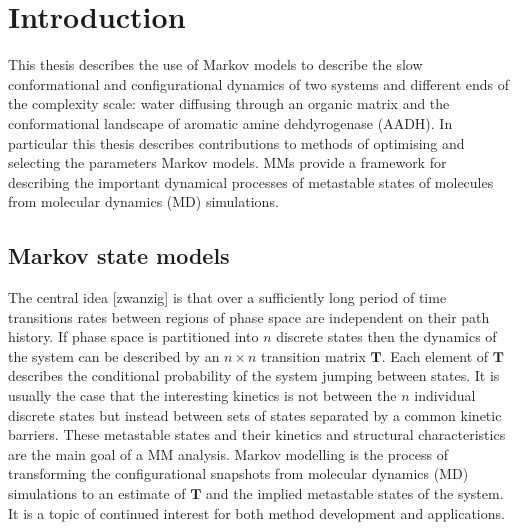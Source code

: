 %
%
\let\textcircled=\pgftextcircled
\chapter{Introduction}
\label{chap:intro}
This thesis describes the use of Markov models to describe the slow conformational and configurational dynamics of two systems and different ends of the complexity scale: water diffusing through an organic matrix and the conformational landscape of aromatic amine dehdyrogenase (AADH). In particular this thesis describes contributions to methods of optimising and selecting the parameters Markov models. MMs provide a framework for describing the important dynamical processes of metastable states of molecules from molecular dynamics (MD) simulations. 

\section{Markov state models}
The central idea [zwanzig] is that over a sufficiently long period of time transitions rates between regions of phase space are independent on their path history. If phase space is partitioned into $n$ discrete states then the dynamics of the system can be described by an $n\times n$ transition matrix $\mathbf{T}$. Each element of $\mathbf{T}$ describes the conditional probability of the system jumping between states. It is usually the case that the interesting kinetics is not between the $n$ individual discrete states but instead between sets of states separated by a common kinetic barriers. These metastable states and their kinetics and structural characteristics are the main goal of a MM analysis. Markov modelling is the process of transforming the configurational snapshots from molecular dynamics (MD) simulations to an estimate of $\mathbf{T}$ and the implied metastable states of the system.  It is a  topic of continued interest \cite{husicMarkovStateModels2018}\cite{noeMarkovModelsMolecular2019b}\cite{wangConstructingMarkovState2018c} for both method development and applications.  

